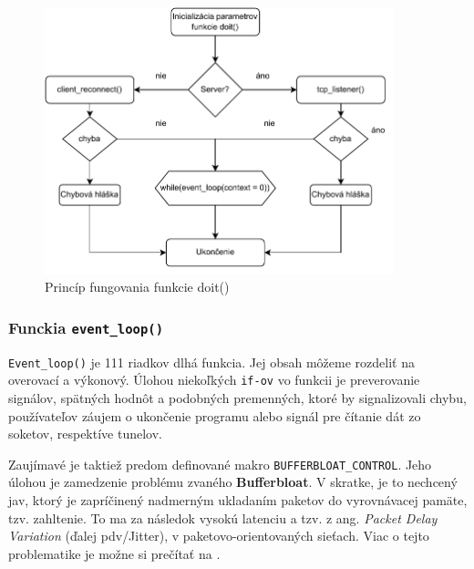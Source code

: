 \begin{figure}
	\centering
	\includegraphics[width=0.9\textwidth]{figures/fc2}
	\caption{Princíp fungovania funkcie doit()}
	\label{fc2}
\end{figure}

\subsubsection{Funckia \lstinline|event_loop()|}
\lstinline|Event_loop()| je 111 riadkov dlhá funkcia. Jej obsah môžeme rozdeliť na overovací a výkonový. Úlohou niekoľkých \lstinline|if-ov| vo funkcii je preverovanie signálov, spätných hodnôt a podobných premenných, ktoré by signalizovali chybu, používateľov záujem o ukončenie programu alebo signál pre čítanie dát zo soketov, respektíve tunelov. 
 
Zaujímavé je taktiež predom definované makro \lstinline|BUFFERBLOAT_CONTROL|. Jeho úlohou je zamedzenie problému zvaného \textbf{Bufferbloat}. V skratke, je to nechcený jav, ktorý je zapríčinený nadmerným ukladaním paketov do vyrovnávacej pamäte, tzv. zahltenie. To ma za následok vysokú latenciu a tzv. z ang. \textit{Packet Delay Variation} (ďalej \acrshort{pdv}/Jitter), v paketovo-orientovaných sieťach. Viac o tejto problematike je možne si prečítať na \cite{bufferbloat}.
 

